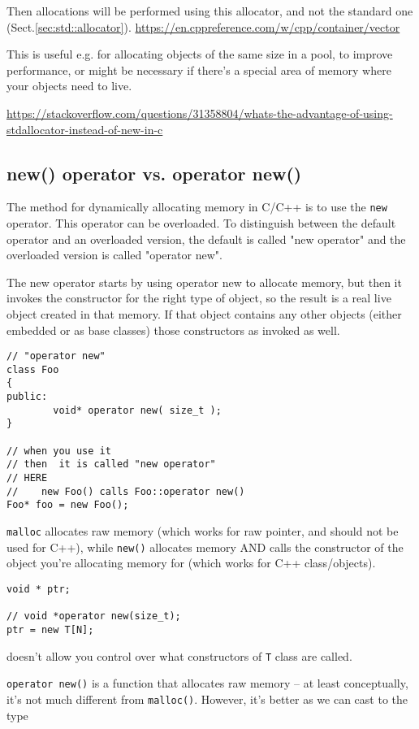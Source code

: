 Then allocations will be performed using this allocator, and not the standard
one (Sect.\ref{sec:std::allocator}).
\url{https://en.cppreference.com/w/cpp/container/vector}

This is useful e.g. for allocating objects of the same size in a pool, to
improve performance, or might be necessary if there's a special area of memory
where your objects need to live.

\url{https://stackoverflow.com/questions/31358804/whats-the-advantage-of-using-stdallocator-instead-of-new-in-c}


\subsection{new() operator vs. operator new()}
\label{sec:new()-operator}
\label{sec:operator-new}

The method for dynamically allocating memory in C/C++ is to use the \verb!new!
operator. This operator can be overloaded. To distinguish between the default
operator and an overloaded version, the default is called "new operator" and the
overloaded version is called "operator new".

The new operator starts by using operator new to allocate memory, but then it
invokes the constructor for the right type of object, so the result is a real
live object created in that memory.
 If that object contains any other objects (either embedded or as base classes)
 those constructors as invoked as well.
 
\begin{verbatim}
// "operator new"
class Foo
{
public:
        void* operator new( size_t );
}

// when you use it
// then  it is called "new operator"
// HERE
//    new Foo() calls Foo::operator new()
Foo* foo = new Foo();
\end{verbatim}


\verb!malloc! allocates raw memory (which works for raw pointer, and should not be used
for C++), while \verb!new()! allocates memory AND calls the constructor of the
object you're allocating memory for (which works for C++ class/objects).

\begin{verbatim}
void * ptr;

// void *operator new(size_t);
ptr = new T[N]; 
\end{verbatim}
doesn't allow you control over what constructors of \verb!T! class are called.

\verb!operator new()! is a function that allocates raw memory -- at least
conceptually, it's not much different from \verb!malloc()!. However, it's better
as we can cast to the type
 
